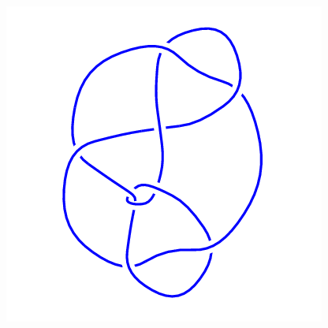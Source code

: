 \begin{figure}[H]
\begin{minipage}[b]{.18\linewidth}
	\end{minipage}
	\begin{minipage}[b]{.18\linewidth}
		\centering
		\includegraphics[width=\linewidth]{../data/9_30.png}
	\end{minipage}
\end{figure}
